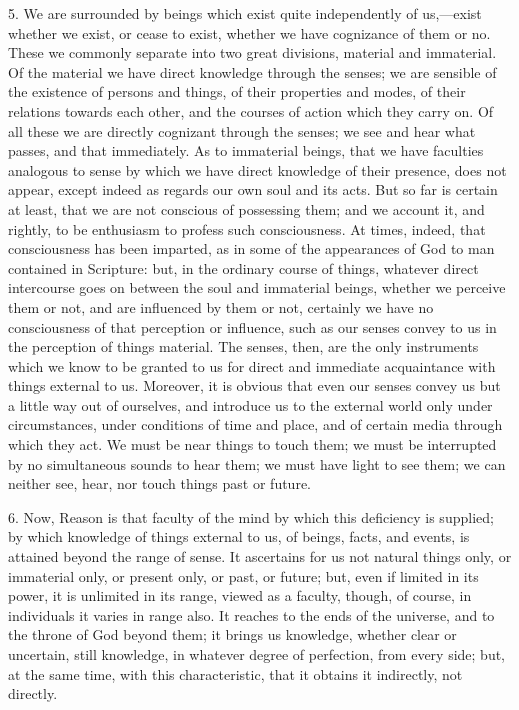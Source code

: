 5. We are surrounded by beings which exist quite independently of
us,—exist whether we exist, or cease to exist, whether we have
cognizance of them or no. These we commonly separate into two great
divisions, material and immaterial. Of the material we have direct
knowledge through the senses; we are sensible of the existence of
persons and things, of their properties and modes, of their relations
towards each other, and the courses of action which they carry on. Of
all these we are directly cognizant through the senses; we see and
hear what passes, and that immediately. As to immaterial beings, that
we have faculties analogous to sense by which we have direct knowledge
of their presence, does not appear, except indeed as regards our own
soul and its acts. But so far is certain at least, that we are not
conscious of possessing them; and we account it, and rightly, to be
enthusiasm to profess such consciousness. At times, indeed, that
consciousness has been imparted, as in some of the appearances of God
to man contained in Scripture: but, in the ordinary course of things,
whatever direct intercourse goes on between the soul and immaterial
beings, whether we perceive them or not, and are influenced by them or
not, certainly we have no consciousness of that perception or
influence, such as our senses convey to us in the perception of things
material. The senses, then, are the only instruments which we know to
be granted to us for direct and immediate acquaintance with things
external to us. Moreover, it is obvious that even our senses convey us
but a little way out of ourselves, and introduce us to the external
world only under circumstances, under conditions of time and place,
and of certain media through which they act. We must be near things to
touch them; we must be interrupted by no simultaneous sounds to hear
them; we must have light to see them; we can neither see, hear, nor
touch things past or future.

6. Now, Reason is that faculty of the mind by which this deficiency
is supplied; by which knowledge of things external to us, of beings,
facts, and events, is attained beyond the range of sense. It
ascertains for us not natural things only, or immaterial only, or
present only, or past, or future; but, even if limited in its power,
it is unlimited in its range, viewed as a faculty, though, of course,
in individuals it varies in range also. It reaches to the ends of the
universe, and to the throne of God beyond them; it brings us
knowledge, whether clear or uncertain, still knowledge, in whatever
degree of perfection, from every side; but, at the same time, with
this characteristic, that it obtains it indirectly, not directly.

